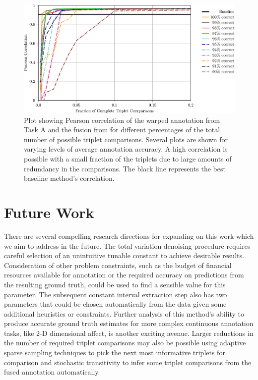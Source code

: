 \documentclass[10pt,letterpaper]{article}
\begin{document}
\begin{figure}[t]
    \begin{adjustwidth}{-2.25in}{0in}
	\centering
    \includegraphics{images/Fig7.eps}
	\caption{Plot showing Pearson correlation of the warped annotation from Task A and the fusion from \cite{Mariooryad2015} for different percentages of the total number of possible triplet comparisons.  Several plots are shown for varying levels of average annotation accuracy.  A high correlation is possible with a small fraction of the triplets due to large amounts of redundancy in the comparisons. The black line represents the best baseline method's correlation.}
	\label{Fig:warp_correlation_robustness}
	\end{adjustwidth}
\end{figure}

\section*{Future Work}
There are several compelling research directions for expanding on this work which we aim to address in the future.  The total variation denoising procedure requires careful selection of an unintuitive tunable constant to achieve desirable results.  Consideration of other problem constraints, such as the budget of financial resources available for annotation or the required accuracy on predictions from the resulting ground truth, could be used to find a sensible value for this parameter.  The subsequent constant interval extraction step also has two parameters that could be chosen automatically from the data given some additional heuristics or constraints.  Further analysis of this method's ability to produce accurate ground truth estimates for more complex continuous annotation tasks, like 2-D dimensional affect, is another exciting avenue.  Larger reductions in the number of required triplet comparisons may also be possible using adaptive sparse sampling techniques to pick the next most informative triplets for comparison and stochastic transitivity to infer some triplet comparisons from the fused annotation automatically.
\end{document}
